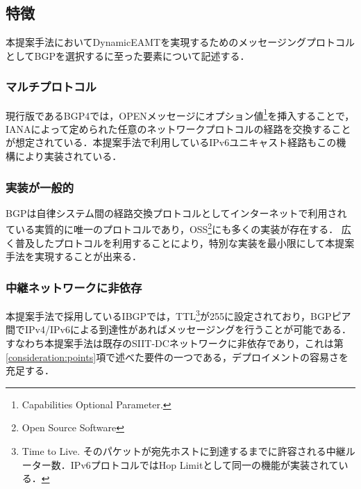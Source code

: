 \subsection{特徴}
本提案手法においてDynamicEAMTを実現するためのメッセージングプロトコルとしてBGPを選択するに至った要素について記述する．

\subsubsection{マルチプロトコル}
現行版であるBGP4では，OPENメッセージにオプション値\footnote{Capabilities Optional Parameter.}を挿入することで，IANAによって定められた任意のネットワークプロトコル\cite{IANA_AFI,IANA_SAFI}の経路を交換することが想定されている\cite{RFC4760}．本提案手法で利用しているIPv6ユニキャスト経路もこの機構により実装されている．


\subsubsection{実装が一般的}
BGPは自律システム間の経路交換プロトコルとしてインターネットで利用されている実質的に唯一のプロトコルであり，OSS\footnote{Open Source Software}にも多くの実装が存在する．
広く普及したプロトコルを利用することにより，特別な実装を最小限にして本提案手法を実現することが出来る．

\subsubsection{中継ネットワークに非依存}
本提案手法で採用しているIBGPでは，TTL\footnote{Time to Live. そのパケットが宛先ホストに到達するまでに許容される中継ルーター数．IPv6プロトコルではHop Limitとして同一の機能が実装されている\cite{RFC8200}．}が255に設定されており，BGPピア間でIPv4/IPv6による到達性があればメッセージングを行うことが可能である．すなわち本提案手法は既存のSIIT-DCネットワークに非依存であり，これは第\ref{consideration:points}項で述べた要件の一つである，デプロイメントの容易さを充足する．


